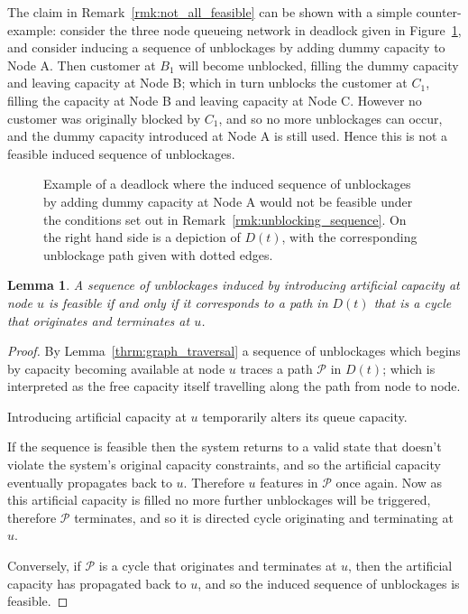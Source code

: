 \documentclass{article}
\newtheorem{lemma}{Lemma}
\begin{document}
The claim in Remark~\ref{rmk:not_all_feasible} can be shown with a simple
counter-example: consider the three node queueing network in deadlock given in
Figure~\ref{fig:counter_example}, and consider inducing a sequence of
unblockages by adding dummy capacity to Node A.
Then customer at $B_1$ will become unblocked, filling the dummy capacity and
leaving capacity at Node B; which in turn unblocks the customer at $C_1$,
filling the capacity at Node B and leaving capacity at Node C.
However no customer was originally blocked by $C_1$, and so no more unblockages
can occur, and the dummy capacity introduced at Node A is still used.
Hence this is not a feasible induced sequence of unblockages.

\begin{figure}
\begin{center}

\end{center}
\caption{Example of a deadlock where the induced sequence of unblockages by
adding dummy capacity at Node A would not be feasible under the conditions set
out in Remark~\ref{rmk:unblocking_sequence}.
On the right hand side is a depiction of $D(t)$, with the corresponding
unblockage path given with dotted edges.}
\label{fig:counter_example}
\end{figure}

\begin{lemma}\label{thrm:feasible_is_cycle}
A sequence of unblockages induced by introducing artificial capacity at node
$u$ is feasible if and only if it corresponds to a path in $D(t)$ that is a
cycle that originates and terminates at $u$.
\end{lemma}

\begin{proof}
By Lemma~\ref{thrm:graph_traversal} a sequence of unblockages which begins by
capacity becoming available at node $u$ traces a path $\mathcal{P}$ in $D(t)$;
which is interpreted as the free capacity itself travelling along the path from
node to node.

Introducing artificial capacity at $u$ temporarily alters its queue capacity.

If the sequence is feasible then the system returns to a valid state that
doesn't violate the system's original capacity constraints, and so the
artificial capacity eventually propagates back to $u$.
Therefore $u$ features in $\mathcal{P}$ once again.
Now as this artificial capacity is filled no more further unblockages will be
triggered, therefore $\mathcal{P}$ terminates, and so it is directed cycle
originating and terminating at $u$.

Conversely, if $\mathcal{P}$ is a cycle that originates and terminates at $u$,
then the artificial capacity has propagated back to $u$, and so the induced
sequence of unblockages is feasible.
\end{proof}
\end{document}
